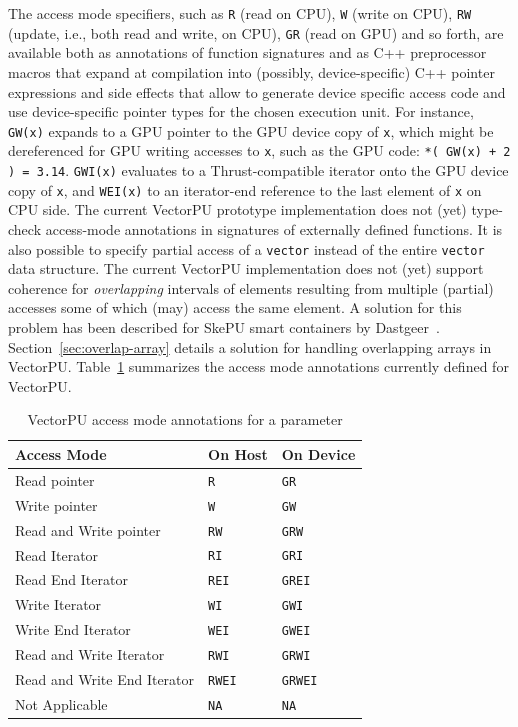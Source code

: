 The access mode specifiers,
such as \texttt{R} (read on CPU), \texttt{W} (write on CPU), \texttt{RW} 
(update, i.e., both read and write, on CPU), \texttt{GR} (read on GPU) and so forth,
are available both as annotations of function signatures and
as C++ preprocessor macros that expand at compilation into (possibly, device-specific) C++ pointer
expressions and side effects that allow to generate device specific access code
and use device-specific pointer types for the chosen execution unit. 
For instance, \texttt{GW(x)} expands to a GPU pointer to
the GPU device copy of \texttt{x},
which might be dereferenced for GPU writing accesses to \texttt{x},
such as the GPU code: \verb:*( GW(x) + 2 ) = 3.14:.
\texttt{GWI(x)} evaluates to a Thrust-compatible iterator onto the 
GPU device copy of \texttt{x}, and \texttt{WEI(x)} to an iterator-end reference
to the last element of \texttt{x} on CPU side. The current VectorPU prototype implementation does not
(yet) type-check access-mode annotations in signatures of externally defined functions.
%
It is also possible to specify partial access of a \verb:vector:
instead of the
entire \verb.vector. data structure. The current
VectorPU implementation does not (yet) support coherence for 
\emph{overlapping}
intervals of elements resulting from multiple (partial) accesses
some of which (may) access the same element.
A solution for this problem has been described for SkePU
smart containers by Dastgeer~\cite{Dastgeer-IJPP15}. Section~\ref{sec:overlap-array} details a solution for handling overlapping arrays in VectorPU.
%
Table~\ref{tab:modes} summarizes the access mode annotations
currently defined for VectorPU.

\begin{table}
\caption{\label{tab:modes}VectorPU access mode annotations for a parameter  \cite{VectorPU-2017}}

\begin{center}
\begin{tabular}{|lll|}
\hline
Access Mode & On Host & On Device \\
\hline
Read pointer & \texttt{R} & \texttt{GR} \\
Write pointer & \texttt{W} & \texttt{GW} \\
Read and Write pointer & \texttt{RW} & \texttt{GRW} \\
Read Iterator & \texttt{RI} & \texttt{GRI} \\
Read End Iterator & \texttt{REI} & \texttt{GREI}\\
Write Iterator & \texttt{WI} & \texttt{GWI}\\
Write End Iterator & \texttt{WEI} & \texttt{GWEI}\\
Read and Write Iterator & \texttt{RWI} & \texttt{GRWI}\\
Read and Write End Iterator & \texttt{RWEI} & \texttt{GRWEI}\\
Not Applicable & \texttt{NA} & \texttt{NA} \\
\hline
\end{tabular}
\vspace{-3ex}
\end{center}
\end{table}


